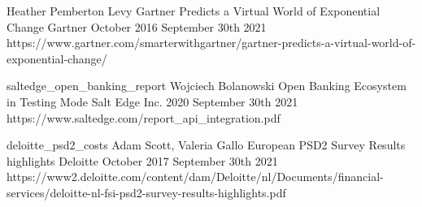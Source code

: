\begin{thebibliography}{100}
{Heather Pemberton Levy}
{Gartner Predicts a Virtual World of Exponential Change}
{Gartner}
{October 2016}
{September 30th 2021}
{https://www.gartner.com/smarterwithgartner/gartner-predicts-a-virtual-world-of-exponential-change/}

\onlinebibitem
{saltedge_open_banking_report}
{Wojciech Bolanowski}
{Open Banking Ecosystem in Testing Mode}
{Salt Edge Inc.}
{2020}
{September 30th 2021}
{https://www.saltedge.com/report\_api\_integration.pdf}

\onlinebibitem
{deloitte_psd2_costs}
{Adam Scott, Valeria Gallo}
{European PSD2 Survey Results highlights}
{Deloitte}
{October 2017}
{September 30th 2021}
{https://www2.deloitte.com/content/dam/Deloitte/nl/Documents/financial-services/deloitte-nl-fsi-psd2-survey-results-highlights.pdf}

\end{thebibliography}
